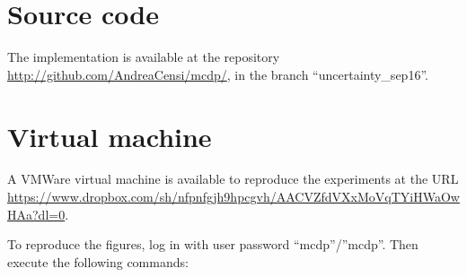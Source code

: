 \section{Source code}

The implementation is available at the repository \url{http://github.com/AndreaCensi/mcdp/},
in the branch ``uncertainty\_sep16''.

\section{Virtual machine }

A VMWare virtual machine is available to reproduce the experiments
at the URL \url{https://www.dropbox.com/sh/nfpnfgjh9hpcgvh/AACVZfdVXxMoVqTYiHWaOwHAa?dl=0}.

To reproduce the figures, log in with user password ``mcdp''/''mcdp''.
Then execute the following commands:


\clearpage



